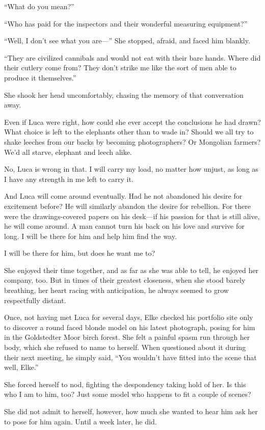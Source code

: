 ``What do you mean?''

``Who has paid for the inspectors and their wonderful measuring equipment?''

``Well, I don't see what you are---'' She stopped, afraid, and faced him blankly.

``They are civilized cannibals and would not eat with their bare hands. Where did their cutlery come from? They don't strike me like the sort of men able to produce it themselves.''

She shook her head uncomfortably, chasing the memory of that conversation away.

Even if Luca were right, how could she ever accept the conclusions he had drawn? What choice is left to the elephants other than to wade in? Should we all try to shake leeches from our backs by becoming photographers? Or Mongolian farmers? We'd all starve, elephant and leech alike.

No, Luca is wrong in that. I will carry my load, no matter how unjust, as long as I have any strength in me left to carry it.

And Luca will come around eventually. Had he not abandoned his desire for excitement before? He will similarly abandon the desire for rebellion. For there were the drawings-covered papers on his desk---if his passion for that is still alive, he will come around. A man cannot turn his back on his love and survive for long. I will be there for him and help him find the way.

I will be there for him, but does he want me to?

She enjoyed their time together, and as far as she was able to tell, he enjoyed her company, too. But in times of their greatest closeness, when she stood barely breathing, her heart racing with anticipation, he always seemed to grow respectfully distant.

Once, not having met Luca for several days, Elke checked his portfolio site only to discover a round faced blonde model on his latest photograph, posing for him in the Goldstedter Moor birch forest. She felt a painful spasm run through her body, which she refused to name to herself. When questioned about it during their next meeting, he simply said, ``You wouldn't have fitted into the scene that well, Elke.''

She forced herself to nod, fighting the despondency taking hold of her. Is this who I am to him, too? Just some model who happens to fit a couple of scenes?

She did not admit to herself, however, how much she wanted to hear him ask her to pose for him again. Until a week later, he did.

